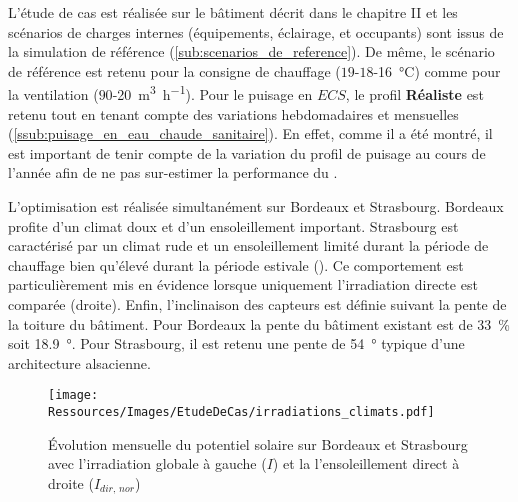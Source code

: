 L’étude de cas est réalisée sur le bâtiment décrit dans le chapitre II et les scénarios de
charges internes (équipements, éclairage, et occupants) sont issus de la simulation de
référence (\ref{sub:scenarios_de_reference}). De même, le scénario de référence est
retenu pour la consigne de chauffage ($19$-$18$-\SI{16}{\celsius}) comme pour la ventilation
($90$-\SI{20}{m^{3}\per h}). Pour le puisage en $ECS$, le profil \textbf{Réaliste} est retenu tout en tenant
compte des variations hebdomadaires et mensuelles
(\ref{ssub:puisage_en_eau_chaude_sanitaire}). En effet, comme il a été montré, il est
important de tenir compte de la variation du profil de puisage au cours de l’année afin de
ne pas sur-estimer la performance du .

L’optimisation est réalisée simultanément sur Bordeaux et Strasbourg. Bordeaux profite
d’un climat doux et d’un ensoleillement important. Strasbourg est caractérisé par un
climat rude et un ensoleillement limité durant la période de chauffage bien qu’élevé
durant la période estivale (). Ce comportement
est particulièrement mis en évidence lorsque uniquement l’irradiation directe est comparée
(droite). Enfin, l’inclinaison des capteurs est définie suivant la pente de la toiture du
bâtiment. Pour Bordeaux la pente du bâtiment existant est de \SI{33}{\percent} soit
\SI{18.9}{\degree}. Pour Strasbourg, il est retenu une pente de \SI{54}{\degree} typique
d’une architecture alsacienne.

\begin{figure}
    \centering
    \texttt{[image: Ressources/Images/EtudeDeCas/irradiations\_climats.pdf]}
    \caption[Évolution mensuelle du potentiel solaire sur Bordeaux et Strasbourg]
            {Évolution mensuelle du potentiel solaire sur Bordeaux et Strasbourg avec l’irradiation
            globale à gauche ($I$) et la l’ensoleillement direct à droite ($I_{dir,\,nor}$)}
    \label{fig:diff_ensoleillement_bor_stras}
\end{figure}



